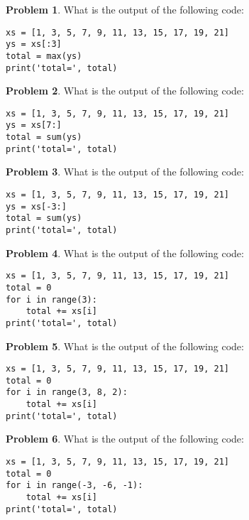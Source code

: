 \documentclass[10pt]{article}
\theoremstyle{definition}
\newtheorem{problem}{Problem}
\begin{document}
\begin{problem}
    What is the output of the following code:
\end{problem}
\begin{lstlisting}
xs = [1, 3, 5, 7, 9, 11, 13, 15, 17, 19, 21]
ys = xs[:3]
total = max(ys)
print('total=', total)
\end{lstlisting}
\vspace{0.15in}

\begin{problem}
    What is the output of the following code:
\end{problem}
\begin{lstlisting}
xs = [1, 3, 5, 7, 9, 11, 13, 15, 17, 19, 21]
ys = xs[7:]
total = sum(ys)
print('total=', total)
\end{lstlisting}
\vspace{0.15in}

\begin{problem}
    What is the output of the following code:
\end{problem}
\begin{lstlisting}
xs = [1, 3, 5, 7, 9, 11, 13, 15, 17, 19, 21]
ys = xs[-3:]
total = sum(ys)
print('total=', total)
\end{lstlisting}
\vspace{0.15in}

\begin{problem}
    What is the output of the following code:
\end{problem}
\begin{lstlisting}
xs = [1, 3, 5, 7, 9, 11, 13, 15, 17, 19, 21]
total = 0
for i in range(3):
    total += xs[i]
print('total=', total)
\end{lstlisting}
\vspace{0.15in}

\begin{problem}
    What is the output of the following code:
\end{problem}
\begin{lstlisting}
xs = [1, 3, 5, 7, 9, 11, 13, 15, 17, 19, 21]
total = 0
for i in range(3, 8, 2):
    total += xs[i]
print('total=', total)
\end{lstlisting}
\vspace{0.15in}

\begin{problem}
    What is the output of the following code:
\end{problem}
\begin{lstlisting}
xs = [1, 3, 5, 7, 9, 11, 13, 15, 17, 19, 21]
total = 0
for i in range(-3, -6, -1):
    total += xs[i]
print('total=', total)
\end{lstlisting}
\vspace{0.15in}
\end{document}

